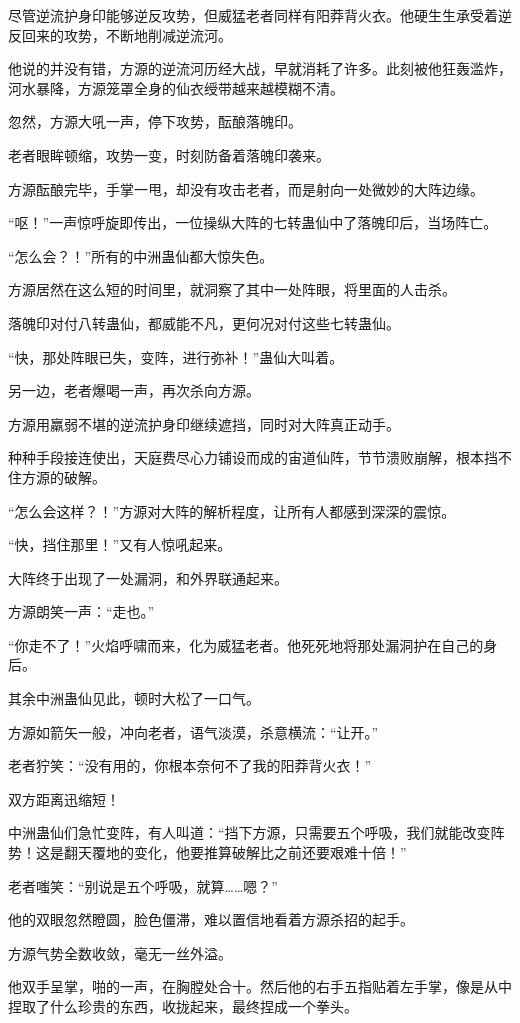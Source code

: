 \begin{this_body}
尽管逆流护身印能够逆反攻势，但威猛老者同样有阳莽背火衣。他硬生生承受着逆反回来的攻势，不断地削减逆流河。

他说的并没有错，方源的逆流河历经大战，早就消耗了许多。此刻被他狂轰滥炸，河水暴降，方源笼罩全身的仙衣绶带越来越模糊不清。

忽然，方源大吼一声，停下攻势，酝酿落魄印。

老者眼眸顿缩，攻势一变，时刻防备着落魄印袭来。

方源酝酿完毕，手掌一甩，却没有攻击老者，而是射向一处微妙的大阵边缘。

“呕！”一声惊呼旋即传出，一位操纵大阵的七转蛊仙中了落魄印后，当场阵亡。

“怎么会？！”所有的中洲蛊仙都大惊失色。

方源居然在这么短的时间里，就洞察了其中一处阵眼，将里面的人击杀。

落魄印对付八转蛊仙，都威能不凡，更何况对付这些七转蛊仙。

“快，那处阵眼已失，变阵，进行弥补！”蛊仙大叫着。

另一边，老者爆喝一声，再次杀向方源。

方源用羸弱不堪的逆流护身印继续遮挡，同时对大阵真正动手。

种种手段接连使出，天庭费尽心力铺设而成的宙道仙阵，节节溃败崩解，根本挡不住方源的破解。

“怎么会这样？！”方源对大阵的解析程度，让所有人都感到深深的震惊。

“快，挡住那里！”又有人惊吼起来。

大阵终于出现了一处漏洞，和外界联通起来。

方源朗笑一声：“走也。”

“你走不了！”火焰呼啸而来，化为威猛老者。他死死地将那处漏洞护在自己的身后。

其余中洲蛊仙见此，顿时大松了一口气。

方源如箭矢一般，冲向老者，语气淡漠，杀意横流：“让开。”

老者狞笑：“没有用的，你根本奈何不了我的阳莽背火衣！”

双方距离迅缩短！

中洲蛊仙们急忙变阵，有人叫道：“挡下方源，只需要五个呼吸，我们就能改变阵势！这是翻天覆地的变化，他要推算破解比之前还要艰难十倍！”

老者嗤笑：“别说是五个呼吸，就算……嗯？”

他的双眼忽然瞪圆，脸色僵滞，难以置信地看着方源杀招的起手。

方源气势全数收敛，毫无一丝外溢。

他双手呈掌，啪的一声，在胸膛处合十。然后他的右手五指贴着左手掌，像是从中捏取了什么珍贵的东西，收拢起来，最终捏成一个拳头。


\end{this_body}
